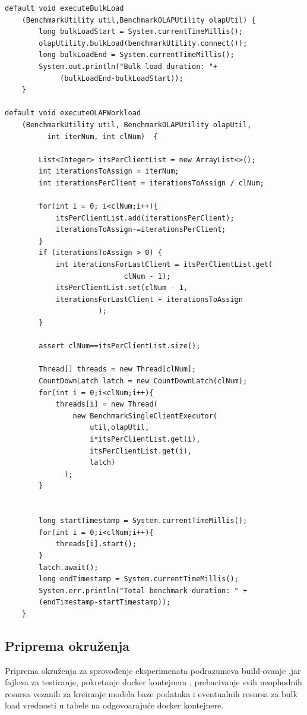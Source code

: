 \documentclass[12pt,oneside]{memoir}
\begin{document}
\begin{lstlisting}[title={OLAPBenchmarkExecutor.java},captionpos=t]
default void executeBulkLoad
	(BenchmarkUtility util,BenchmarkOLAPUtility olapUtil) {
        long bulkLoadStart = System.currentTimeMillis();
        olapUtility.bulkLoad(benchmarkUtility.connect());
        long bulkLoadEnd = System.currentTimeMillis();
        System.out.println("Bulk load duration: "+
       	 	 (bulkLoadEnd-bulkLoadStart));
    }

default void executeOLAPWorkload
    (BenchmarkUtility util, BenchmarkOLAPUtility olapUtil, 
          int iterNum, int clNum)  {

        List<Integer> itsPerClientList = new ArrayList<>();
        int iterationsToAssign = iterNum;
        int iterationsPerClient = iterationsToAssign / clNum;

        for(int i = 0; i<clNum;i++){
            itsPerClientList.add(iterationsPerClient);
            iterationsToAssign-=iterationsPerClient;
        }
        if (iterationsToAssign > 0) {
            int iterationsForLastClient = itsPerClientList.get(
							clNum - 1);
            itsPerClientList.set(clNum - 1, 
			iterationsForLastClient + iterationsToAssign
					  );
        }

        assert clNum==itsPerClientList.size();

        Thread[] threads = new Thread[clNum];
        CountDownLatch latch = new CountDownLatch(clNum);
        for(int i = 0;i<clNum;i++){
            threads[i] = new Thread(
				new BenchmarkSingleClientExecutor(
					util,olapUtil,
					i*itsPerClientList.get(i),
					itsPerClientList.get(i),
					latch)
			  );
        }


        long startTimestamp = System.currentTimeMillis();
        for(int i = 0;i<clNum;i++){
            threads[i].start();
        }
        latch.await();
        long endTimestamp = System.currentTimeMillis();
        System.err.println("Total benchmark duration: " + 
		(endTimestamp-startTimestamp));
    }
\end{lstlisting}

\subsection{Priprema okruženja}

Priprema okruženja za sprovođenje eksperimenata podrazumeva build-ovanje  .jar fajlova za testiranje, pokretanje docker kontejnera , prebacivanje svih neophodnih resursa vezanih za kreiranje modela baze podataka i eventualnih resursa za bulk load vrednosti u tabele na odgovoarajuće docker kontejnere.
\end{document}
